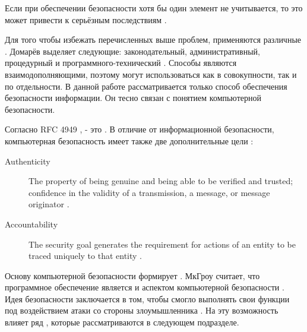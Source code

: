 %
%
Если при обеспечении безопасности хотя бы один элемент  не учитывается, то это может привести к серьёзным последствиям .
%
%
%

%
Для того чтобы избежать перечисленных выше проблем, применяются различные .
%
Домарёв выделяет следующие: законодательный, административный, процедурный и программного-технический . 
%
Способы являются взаимодополняющими, поэтому могут использоваться как в совокупности, так и по отдельности. 
%
В данной работе рассматривается только  способ обеспечения безопасности информации.
%
Он тесно связан с понятием компьютерной безопасности.

%
Согласно RFC 4949 ,  - это .
%
В отличие от информационной безопасности, компьютерная безопасность имеет также две дополнительные цели : 
%
\begin{description}

	\item[Authenticity] The property of being genuine and being able to be verified and trusted; confidence in the validity of a transmission, a message, or message originator .

	\item[Accountability] The security goal generates the requirement for actions of an entity to be traced uniquely to that entity .
\end{description}

%
Основу компьютерной безопасности формирует .
%
МкГроу считает, что программное обеспечение является  и  аспектом компьютерной безопасности . 
%
Идея безопасности  заключается в том, чтобы  смогло  выполнять свои функции под воздействием атаки со стороны злоумышленника .
%
На эту возможность влияет ряд , которые рассматриваются в следующем подразделе.